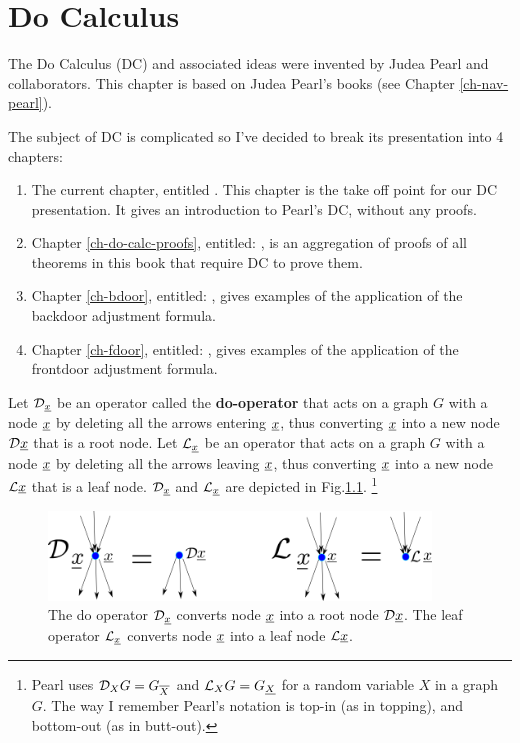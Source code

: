 \chapter{Do Calculus}\label{ch-do-calc}


The Do Calculus (DC) and associated ideas were
invented by
Judea Pearl and collaborators.
This chapter is
based on Judea Pearl's
books (see Chapter \ref{ch-nav-pearl}).

The subject of DC is complicated
so I've decided to break its presentation 
into 4 chapters:
\begin{enumerate}
\item The current chapter, entitled . This chapter is the take off point for our DC presentation.
It gives an introduction  to Pearl's DC,
without any proofs.
\item Chapter \ref{ch-do-calc-proofs}, entitled: , is an aggregation
of proofs of all theorems in this book
that require DC to prove them.

\item Chapter \ref{ch-bdoor}, entitled: , gives examples of the application
of the backdoor adjustment formula.

\item Chapter \ref{ch-fdoor}, entitled: , gives examples of the application
of the frontdoor adjustment formula.

\end{enumerate}



Let
$\cald_\rvx$
be an operator called the {\bf do-operator}
that acts on a graph $G$
with a node
$\rvx$
by
deleting
all
the
arrows
entering
$\rvx$,
thus
converting
$\rvx$
into
a new
node $\cald \rvx$
that
is a root node.
Let
$\call_\rvx$
be an operator that acts
on a graph $G$
with a node
$\rvx$
by deleting
all
the
arrows
leaving
$\rvx$,
thus
converting
$\rvx$
into
a new
node $\call \rvx$
that
is a leaf node.
$\cald_\rvx$
and
$\call_\rvx$
are
depicted
in Fig.\ref{fig-do-rho-lam}.
\footnote{Pearl
uses ${\cal D}_X G=
G_{\overline{X}}
$
and
$\call_X G=
G_{\ul{X}}$
for a random variable $X$
in a graph $G$.
The way I remember
Pearl's notation is top-in (as in topping), and
bottom-out (as in butt-out).}




\begin{figure}[h!]
\centering
\includegraphics[width=4in]
{do-calc/do-rho-lam.png}
\caption{
The do operator $\cald_\rvx$
converts node $\rvx$
into a root node $\cald \rvx$.
The leaf operator $\call_\rvx$
converts node $\rvx$
into a leaf node $\call\rvx$.
}
\label{fig-do-rho-lam}
\end{figure}


